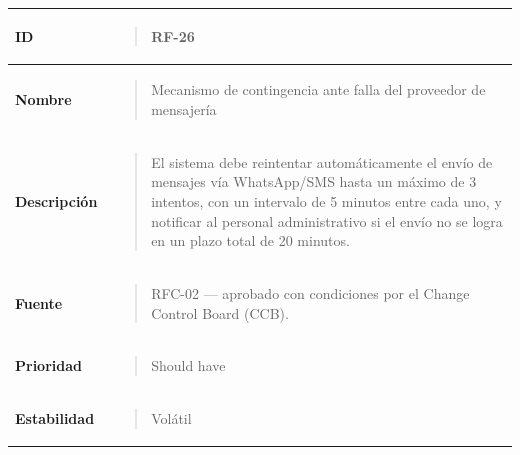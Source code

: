 \documentclass[
]{article}
\newcounter{none} %
\begin{document}
{\def\LTcaptype{none} %
\begin{longtable}[]{@{}
  >{\raggedright\arraybackslash}p{}
  >{\raggedright\arraybackslash}p{}@{}}
\toprule\noalign{}
\begin{minipage}[b]{\linewidth}\raggedright
\textbf{ID}
\end{minipage} & \begin{minipage}[b]{\linewidth}\raggedright
\begin{quote}
RF-26
\end{quote}
\end{minipage} \\
\midrule\noalign{}
\endhead
\bottomrule\noalign{}
\endlastfoot
\textbf{Nombre} & \begin{minipage}[t]{\linewidth}\raggedright
\begin{quote}
Mecanismo de contingencia ante falla del proveedor de mensajería
\end{quote}
\end{minipage} \\
\textbf{Descripción} & \begin{minipage}[t]{\linewidth}\raggedright
\begin{quote}
El sistema debe reintentar automáticamente el envío de mensajes vía
WhatsApp/SMS hasta un máximo de 3 intentos, con un intervalo de 5
minutos entre cada uno, y notificar al personal administrativo si el
envío no se logra en un plazo total de 20 minutos.
\end{quote}
\end{minipage} \\
\textbf{Fuente} & \begin{minipage}[t]{\linewidth}\raggedright
\begin{quote}
RFC-02 --- aprobado con condiciones por el Change Control Board (CCB).
\end{quote}
\end{minipage} \\
\textbf{Prioridad} & \begin{minipage}[t]{\linewidth}\raggedright
\begin{quote}
Should have
\end{quote}
\end{minipage} \\
\textbf{Estabilidad} & \begin{minipage}[t]{\linewidth}\raggedright
\begin{quote}
Volátil

\end{quote}
\end{minipage}
\end{longtable}}
\end{document}
